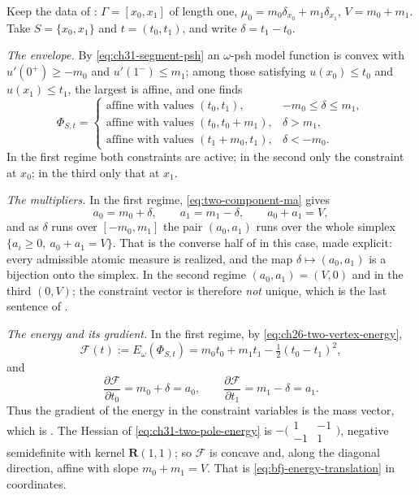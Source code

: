 \begin{example}
\label{ex:ch31-two-pole-programme}
Keep the data of : \(\Gamma=[x_0,x_1]\) of
length one, \(\mu_0=m_0\delta_{x_0}+m_1\delta_{x_1}\), \(V=m_0+m_1\).  Take
\(S=\{x_0,x_1\}\) and \(t=(t_0,t_1)\), and write \(\delta=t_1-t_0\).

\emph{The envelope.}  By \eqref{eq:ch31-segment-psh} an \(\omega\)-psh model
function is convex with \(u'(0^+)\geq-m_0\) and \(u'(1^-)\leq m_1\); among
those satisfying \(u(x_0)\leq t_0\) and \(u(x_1)\leq t_1\), the largest is
affine, and one finds
\begin{equation}
\label{eq:ch31-two-pole-envelope}
 \Phi_{S,t}=
 \begin{cases}
  \text{affine with values }(t_0,t_1), & -m_0\leq\delta\leq m_1,\\
  \text{affine with values }(t_0,t_0+m_1), & \delta>m_1,\\
  \text{affine with values }(t_1+m_0,t_1), & \delta<-m_0 .
 \end{cases}
\end{equation}
In the first regime both constraints are active; in the second only the
constraint at \(x_0\); in the third only that at \(x_1\).

\emph{The multipliers.}  In the first regime,
\eqref{eq:two-component-ma} gives
\begin{equation}
\label{eq:ch31-two-pole-masses}
 a_0=m_0+\delta,\qquad a_1=m_1-\delta,\qquad a_0+a_1=V ,
\end{equation}
and as \(\delta\) runs over \([-m_0,m_1]\) the pair \((a_0,a_1)\) runs over
the whole simplex \(\{a_i\geq0,\ a_0+a_1=V\}\).  That is the converse half
of  in this case, made explicit: every
admissible atomic measure is realized, and the map \(\delta\mapsto(a_0,a_1)\)
is a bijection onto the simplex.  In the second regime
\((a_0,a_1)=(V,0)\) and in the third \((0,V)\); the constraint vector is
therefore \emph{not} unique, which is the last sentence of
.

\emph{The energy and its gradient.}  In the first regime, by
\eqref{eq:ch26-two-vertex-energy},
\begin{equation}
\label{eq:ch31-two-pole-energy}
 \mathcal F(t):=E_\omega(\Phi_{S,t})=m_0t_0+m_1t_1-\tfrac12(t_0-t_1)^2 ,
\end{equation}
and
\[
 \frac{\partial\mathcal F}{\partial t_0}=m_0+\delta=a_0,
 \qquad
 \frac{\partial\mathcal F}{\partial t_1}=m_1-\delta=a_1 .
\]
Thus the gradient of the energy in the constraint variables is the mass
vector, which is .  The Hessian of \eqref{eq:ch31-two-pole-energy}
is
\(-\bigl(\begin{smallmatrix}1&-1\\-1&1\end{smallmatrix}\bigr)\), negative
semidefinite with kernel \(\mathbf R(1,1)\); so \(\mathcal F\) is concave and, along
the diagonal direction, affine with slope \(m_0+m_1=V\).  That is
\eqref{eq:bfj-energy-translation} in coordinates.


\end{example}
